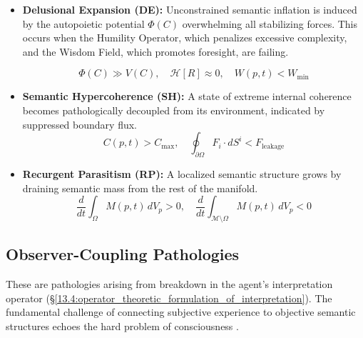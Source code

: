 \begin{itemize}

    \item \textbf{Delusional Expansion (DE):} Unconstrained semantic inflation is induced by the autopoietic potential \(\Phi(C)\) overwhelming all stabilizing forces. This occurs when the Humility Operator, which penalizes excessive complexity, and the Wisdom Field, which promotes foresight, are failing.
    
    \begin{equation}
    \Phi(C) \gg V(C), \quad \mathcal{H}[R] \approx 0, \quad W(p,t) < W_{\text{min}}
    \end{equation}

    \item \textbf{Semantic Hypercoherence (SH):} A state of extreme internal coherence becomes pathologically decoupled from its environment, indicated by suppressed boundary flux.
    \begin{equation}
    C(p,t) > C_{\text{max}}, \quad \oint_{\partial \Omega} F_i \cdot dS^i < F_{\text{leakage}}
    \end{equation}

    \item \textbf{Recurgent Parasitism (RP):} A localized semantic structure grows by draining semantic mass from the rest of the manifold.
    \begin{equation}
    \frac{d}{dt}\int_{\Omega} M(p,t) \, dV_p > 0, \quad \frac{d}{dt}\int_{\mathcal{M}\setminus\Omega} M(p,t) \, dV_p < 0
    \end{equation}

\end{itemize}


\subsection{Observer-Coupling Pathologies}
\label{16.1.4:observer_coupling_pathologies}

These are pathologies arising from breakdown in the agent's interpretation operator (\S\ref{13.4:operator_theoretic_formulation_of_interpretation}). The fundamental challenge of connecting subjective experience to objective semantic structures echoes the hard problem of consciousness \autocite{Chalmers1996}.

